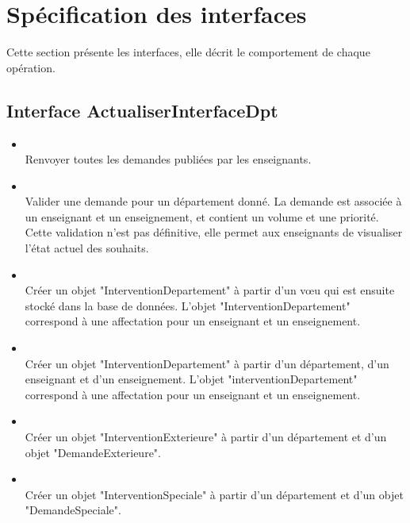 \section{Spécification des interfaces}

    Cette section présente les interfaces, elle décrit le comportement de chaque opération.

	\subsection{Interface ActualiserInterfaceDpt}
	
    	\begin{itemize}
    	    \item {} \\
    	    Renvoyer toutes les demandes publiées par les enseignants.
    	    
    	    \item {}\\
    	    Valider une demande pour un département donné. La demande est associée à un enseignant et un enseignement, et contient un volume et une priorité. Cette validation n'est pas définitive, elle permet aux enseignants de visualiser l'état actuel des souhaits.
    	    
    	    \item {}\\
    	    Créer un objet "InterventionDepartement" à partir d'un v\oe{}u qui est ensuite stocké dans la base de données. L'objet "InterventionDepartement" correspond à une affectation pour un enseignant et un enseignement.
    	    
    	    \item {}\\
    	    Créer un objet "InterventionDepartement" à partir d'un département, d'un enseignant et d'un enseignement. L'objet "interventionDepartement" correspond à une affectation pour un enseignant et un enseignement.
    	    
    	    \item {}\\
    	    Créer un objet "InterventionExterieure" à partir d'un département et d'un objet "DemandeExterieure".
    	    
    	    \item {}\\
    	    Créer un objet "InterventionSpeciale" à partir d'un département et d'un objet "DemandeSpeciale".
    	    

\end{itemize}
